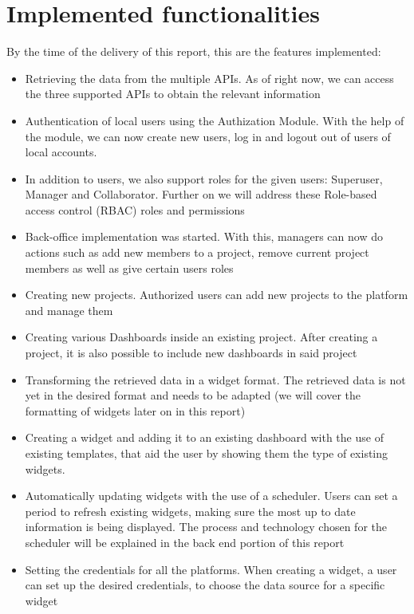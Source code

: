 \documentclass[a4paper,twoside,10pt]{report}
\begin{document}
\section{Implemented functionalities}
By the time of the delivery of this report, this are the features implemented:
 
\begin{itemize}
     \item Retrieving the data from the multiple APIs. As of right now, we can access the three supported APIs to obtain the relevant information
    
     \item Authentication of local users using the Authization Module. With the help of the module, we can now create new users, log in and logout out of users of local accounts.
    
     \item In addition to users, we also support roles for the given users: Superuser, Manager and Collaborator. Further on we will address these Role-based access control\cite{RBAC} (RBAC) roles and permissions
    
     \item Back-office implementation was started. With this, managers can now do actions such as add new members to a project, remove current project members as well as give certain users roles

     \item Creating new projects. Authorized users can add new projects to the platform and manage them

     \item Creating various Dashboards inside an existing project. After creating a project, it is also possible to include new dashboards in said project

     \item Transforming the retrieved data in a widget format. The retrieved data is not yet in the desired format and needs to be adapted (we will cover the formatting of widgets later on in this report)

     \item Creating a widget and adding it to an existing dashboard with the use of existing templates, that aid the user by showing them the type of existing widgets.

     \item Automatically updating widgets with the use of a scheduler. Users can set a period to refresh existing widgets, making sure the most up to date information is being displayed. The process and technology chosen for the scheduler will be explained in the back end portion of this report

     \item Setting the credentials for all the platforms. When creating a widget, a user can set up the desired credentials, to choose the data source for a specific widget
\end{itemize}
\end{document}
